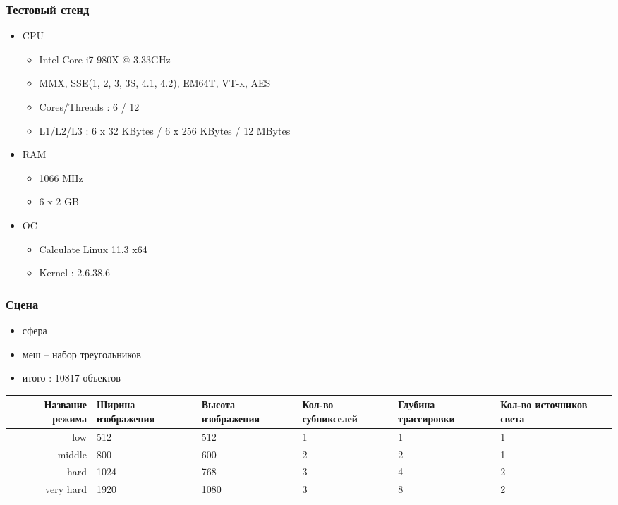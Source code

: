 \documentclass[utf8, 12pt]{beamer}
\begin{document}
\begin{frame}
\frametitle{Тестовый стенд}
\begin{itemize}
\item CPU
\begin{itemize}
\item Intel Core i7 980X @ 3.33GHz
\item MMX, SSE(1, 2, 3, 3S, 4.1, 4.2), EM64T, VT-x, AES
\item Cores/Threads : 6 / 12
\item L1/L2/L3 : 6 x 32 KBytes / 6 x 256 KBytes / 12 MBytes
\end{itemize}
\item RAM
\begin{itemize}
\item 1066 MHz
\item 6 x 2 GB
\end{itemize}
\item OC
\begin{itemize}
\item Calculate Linux 11.3 x64 
\item Kernel : 2.6.38.6
\end{itemize}
\end{itemize}
\end{frame}

\begin{frame}
\frametitle{Сцена}
\begin{itemize}
\item сфера
\item меш -- набор треугольников 
\item итого : 10817 объектов
\end{itemize}

\def\lllen{1.20cm}
\begin{center}
{\noindent \scriptsize
\begin{tabular}{|r|p{\lllen}|p{\lllen}|p{\lllen}|p{\lllen}|p{\lllen}|}
\hline
Название режима & Ширина изображения &  Высота изображения  & Кол-во субпикселей & Глубина трассировки & Кол-во источников света \\  \hline
low       & 512  & 512  & 1 & 1 & 1 \\ \hline
middle    & 800  & 600  & 2 & 2 & 1 \\ \hline
hard      & 1024 & 768  & 3 & 4 & 2 \\ \hline
very hard & 1920 & 1080 & 3 & 8 & 2 \\ \hline
\end{tabular}
}
\end{center}
\end{frame}
\end{document}
